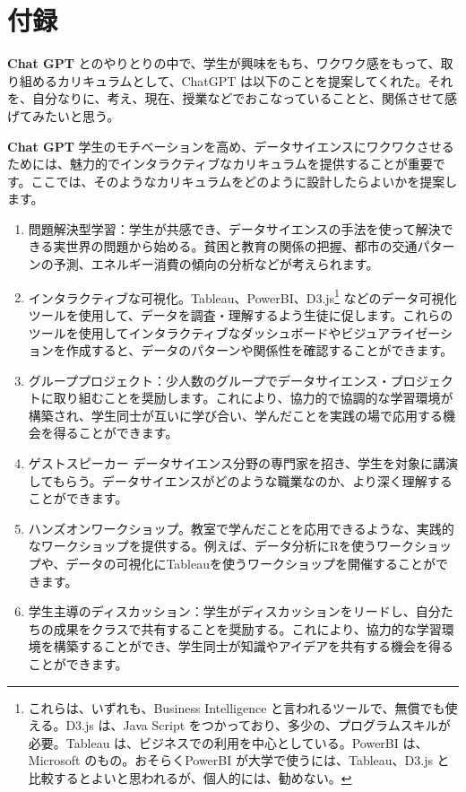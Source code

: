 \documentclass[
]{book}
\theoremstyle{definition}
\theoremstyle{definition}
\theoremstyle{definition}
\theoremstyle{definition}
\theoremstyle{remark}
\begin{document}
\hypertarget{ux4ed8ux9332}{%
\section{付録}\label{ux4ed8ux9332}}

\textbf{Chat GPT} とのやりとりの中で、学生が興味をもち、ワクワク感をもって、取り組めるカリキュラムとして、ChatGPT は以下のことを提案してくれた。それを、自分なりに、考え、現在、授業などでおこなっていることと、関係させて感げてみたいと思う。

\textbf{Chat GPT} 学生のモチベーションを高め、データサイエンスにワクワクさせるためには、魅力的でインタラクティブなカリキュラムを提供することが重要です。ここでは、そのようなカリキュラムをどのように設計したらよいかを提案します。

\begin{enumerate}
\def\labelenumi{\arabic{enumi}.}
\item
  問題解決型学習：学生が共感でき、データサイエンスの手法を使って解決できる実世界の問題から始める。貧困と教育の関係の把握、都市の交通パターンの予測、エネルギー消費の傾向の分析などが考えられます。
\item
  インタラクティブな可視化。Tableau、PowerBI、D3.js\footnote{これらは、いずれも、Business Intelligence と言われるツールで、無償でも使える。D3.js は、Java Script をつかっており、多少の、プログラムスキルが必要。Tableau は、ビジネスでの利用を中心としている。PowerBI は、Microsoft のもの。おそらくPowerBI が大学で使うには、Tableau、D3.js と比較するとよいと思われるが、個人的には、勧めない。} などのデータ可視化ツールを使用して、データを調査・理解するよう生徒に促します。これらのツールを使用してインタラクティブなダッシュボードやビジュアライゼーションを作成すると、データのパターンや関係性を確認することができます。
\item
  グループプロジェクト：少人数のグループでデータサイエンス・プロジェクトに取り組むことを奨励します。これにより、協力的で協調的な学習環境が構築され、学生同士が互いに学び合い、学んだことを実践の場で応用する機会を得ることができます。
\item
  ゲストスピーカー データサイエンス分野の専門家を招き、学生を対象に講演してもらう。データサイエンスがどのような職業なのか、より深く理解することができます。
\item
  ハンズオンワークショップ。教室で学んだことを応用できるような、実践的なワークショップを提供する。例えば、データ分析にRを使うワークショップや、データの可視化にTableauを使うワークショップを開催することができます。
\item
  学生主導のディスカッション：学生がディスカッションをリードし、自分たちの成果をクラスで共有することを奨励する。これにより、協力的な学習環境を構築することができ、学生同士が知識やアイデアを共有する機会を得ることができます。
\end{enumerate}
\end{document}
